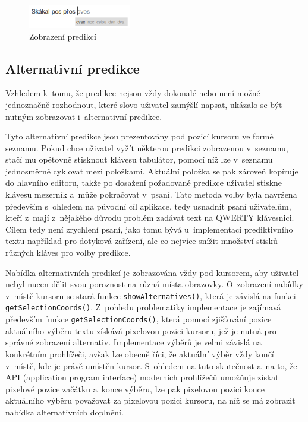 \documentclass[a4paper,11pt,openany]{book} %
\begin{document}
\begin{figure}[ht]
	\centering
	\includegraphics[width=0.4\textwidth]{nlp_predict_1}
	\caption{Zobrazení predikcí}
	\label{fig:nlp-predict}
\end{figure}

\subsection{Alternativní predikce}

Vzhledem k~tomu, že predikce nejsou vždy dokonalé nebo není možné jednoznačně rozhodnout, které slovo uživatel zamýšlí napsat, ukázalo se být nutným zobrazovat i~alternativní predikce. 

Tyto alternativní predikce jsou prezentovány pod pozicí kursoru ve formě seznamu. Pokud chce uživatel vyžít některou predikci zobrazenou v~seznamu, stačí mu opětovně stisknout klávesu tabulátor, pomocí níž lze v~seznamu jednosměrně cyklovat mezi položkami. Aktuální položka se pak zároveň kopíruje do hlavního editoru, takže po dosažení požadované predikce uživatel stiskne klávesu mezerník a~může pokračovat v~psaní. Tato metoda volby byla navržena především s~ohledem na původní cíl aplikace, tedy usnadnit psaní uživatelům, kteří z~mají z~nějakého důvodu problém zadávat text na QWERTY klávesnici. Cílem tedy není zrychlení psaní, jako tomu bývá u~implementací prediktivního textu například pro dotyková zařízení, ale co nejvíce snížit množství stisků různých kláves pro volby predikce.

Nabídka alternativních predikcí je zobrazována vždy pod kursorem, aby uživatel nebyl nucen dělit svou poroznost na různá místa obrazovky. O~zobrazení nabídky v~místě kursoru se stará funkce {\tt show\-Alternatives()}, která je závislá na funkci {\tt get\-Selection\-Coords()}. Z~pohledu problematiky implementace je zajímavá především funkce {\tt get\-Selection\-Coords()}, která pomocí zjišťování pozice aktuálního výběru textu získává pixelovou pozici kursoru, jež je nutná pro správné zobrazení alternativ. Implementace výběrů je velmi závislá na konkrétním prohlížeči, avšak lze obecně říci, že aktuální výběr vždy končí v~místě, kde je právě umístěn kursor. S~ohledem na tuto skutečnost a~na to, že API (application program interface) moderních prohlížečů umožňuje získat pixelové pozice začátku a~konce výběru, lze pak pixelovou pozici konce aktuálního výběru považovat za pixelovou pozici kursoru, na níž se má zobrazit nabídka alternativních doplnění. 
\end{document}
